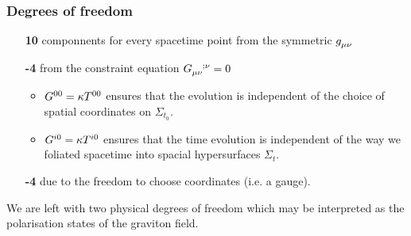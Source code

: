 \subsubsection{Degrees of freedom}
\begin{itemize}
  \item[\textsf{\textbf{10}}]
  componnents for every spacetime point from the symmetric $\tensor{g}{_\mu_\nu}$
  \item[\textsf{\textbf{-4}}] from the
  constraint equation $\tensor{G}{_\mu_\nu^{;\nu}}=0$
  \begin{itemize}
    \item
    $\tensor{G}{^0^0}=\kappa \tensor{T}{^0^0}$ ensures that the
    evolution is independent of the choice of spatial coordinates on
    $\Sigma_{t_0}$.
    \item
    $\tensor{G}{^i^0}=\kappa \tensor{T}{^i^0}$ ensures that the time
    evolution is independent of the way we foliated spacetime into spacial
    hypersurfaces $\Sigma_{t}.    $
  \end{itemize}
  \item[\textsf{\textbf{-4}}] due to the freedom
  to choose coordinates (i.e. a gauge).
\end{itemize}
We are left with two physical degrees of freedom which may be interpreted as the
polarisation states of the graviton field.
